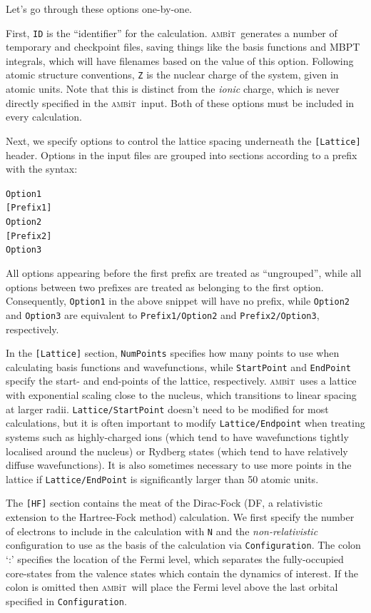 \documentclass{report}
\newcommand{\ambit}{\textsc{amb}{\footnotesize i}\textsc{t}}
\begin{document}
Let's go through these options one-by-one. 

First, \texttt{ID} is the ``identifier'' for the calculation. \ambit\  generates a number of temporary
and checkpoint files, saving things like the basis functions and MBPT integrals, which will have
filenames based on the value of this option. Following atomic structure conventions, \texttt{Z} is the
nuclear charge of the system, given in atomic units. Note that this is distinct from the \textit{ionic}
charge, which is never directly specified in the \ambit\  input. Both of these options must be included
in every calculation.

Next, we specify options to control the lattice spacing underneath the \texttt{[Lattice]} header. 
Options in the input files are grouped into sections according to a prefix with the
syntax:

\texttt{Option1}
\smallskip\\
\texttt{[Prefix1]}\\
\texttt{Option2}
\smallskip\\
\texttt{[Prefix2]}\\
\texttt{Option3}

All options appearing before the first prefix are treated as ``ungrouped'', while all options between
two prefixes are treated as belonging to the first option. Consequently, \texttt{Option1} in the above
snippet will have no prefix, while \texttt{Option2} and \texttt{Option3} are equivalent to
\texttt{Prefix1/Option2} and \texttt{Prefix2/Option3}, respectively.

In the \texttt{[Lattice]} section, \texttt{NumPoints} specifies how many points to use when calculating
basis functions and wavefunctions, while \texttt{StartPoint} and \texttt{EndPoint} specify the start-
and end-points of the lattice, respectively. \ambit\  uses a lattice with exponential scaling close to
the nucleus, which transitions to linear spacing at larger radii. \texttt{Lattice/StartPoint} doesn't
need to be modified for most calculations, but it is often important to modify \texttt{Lattice/Endpoint}
when treating systems such as highly-charged ions (which tend to have wavefunctions tightly localised
around the nucleus) or Rydberg states (which tend to have relatively diffuse wavefunctions). It is also
sometimes necessary to use more points in the lattice if \texttt{Lattice/EndPoint} is significantly
larger than 50 atomic units.

The \texttt{[HF]} section contains the meat of the Dirac-Fock (DF, a relativistic extension to the
Hartree-Fock method) calculation. We first specify the number of electrons to include in the calculation
with \texttt{N} and the \emph{non-relativistic} configuration to use as the basis of the calculation via
\texttt{Configuration}. The colon `:' specifies the location of the Fermi level, which separates the
fully-occupied core-states from the valence states which contain the dynamics of interest. If the colon
is omitted then \ambit\  will place the Fermi level above the last orbital specified in
\texttt{Configuration}.
\end{document}
